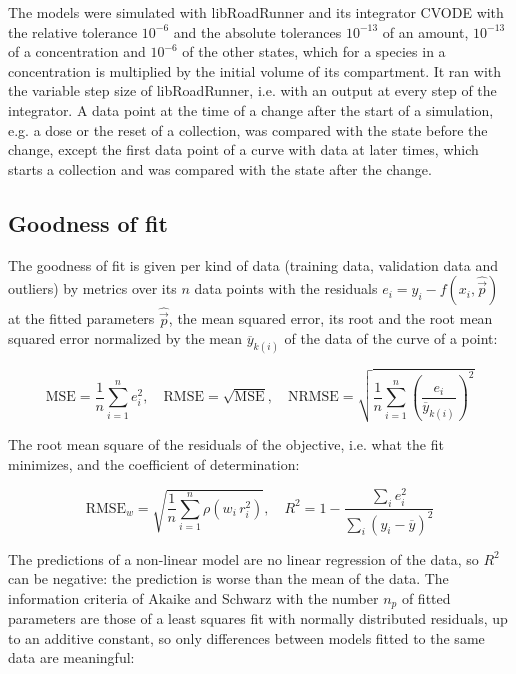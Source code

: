 \documentclass{article}
\begin{document}
The models were simulated with libRoadRunner \cite{Welsh2023} and its integrator CVODE \cite{Hindmarsh2005} with the relative tolerance $10^{-6}$ and the absolute tolerances $10^{-13}$ of an amount, $10^{-13}$ of a concentration and $10^{-6}$ of the other states, which for a species in a concentration is multiplied by the initial volume of its compartment. It ran with the variable step size of libRoadRunner, i.e. with an output at every step of the integrator. A data point at the time of a change after the start of a simulation, e.g. a dose or the reset of a collection, was compared with the state before the change, except the first data point of a curve with data at later times, which starts a collection and was compared with the state after the change.

\subsection{Goodness of fit}

The goodness of fit is given per kind of data (training data, validation data and outliers) by metrics over its $n$ data points with the residuals $e_i = y_i - f(x_i, \hat{\vec{p}})$ at the fitted parameters $\hat{\vec{p}}$, the mean squared error, its root and the root mean squared error normalized by the mean $\overline{y}_{k(i)}$ of the data of the curve of a point:

\begin{equation}
\mathrm{MSE} = \frac{1}{n} \sum_{i=1}^{n} e_i^2, \quad \mathrm{RMSE} = \sqrt{\mathrm{MSE}}, \quad \mathrm{NRMSE} = \sqrt{\frac{1}{n} \sum_{i=1}^{n} \left(\frac{e_i}{\overline{y}_{k(i)}}\right)^2}
\end{equation}

The root mean square of the residuals of the objective, i.e. what the fit minimizes, and the coefficient of determination:

\begin{equation}
\mathrm{RMSE}_w = \sqrt{\frac{1}{n} \sum_{i=1}^{n} \rho\left(w_i\, r_i^2\right)}, \quad R^2 = 1 - \frac{\sum_{i} e_i^2}{\sum_{i} \left(y_i - \overline{y}\right)^2}
\end{equation}

The predictions of a non-linear model are no linear regression of the data, so $R^2$ can be negative: the prediction is worse than the mean of the data. The information criteria of Akaike \cite{Akaike1974} and Schwarz \cite{Schwarz1978} with the number $n_p$ of fitted parameters are those of a least squares fit with normally distributed residuals, up to an additive constant, so only differences between models fitted to the same data are meaningful:
\end{document}
